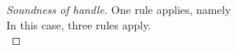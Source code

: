 \begin{proof}[Soundness of handle]
{One rule applies, namely \\
%
%
%
}
%
 {
In this case, three rules apply.\\
   {
   }
%
  {
%
%
%
}
  {
%
%
  }
 }
%

\end{proof}
